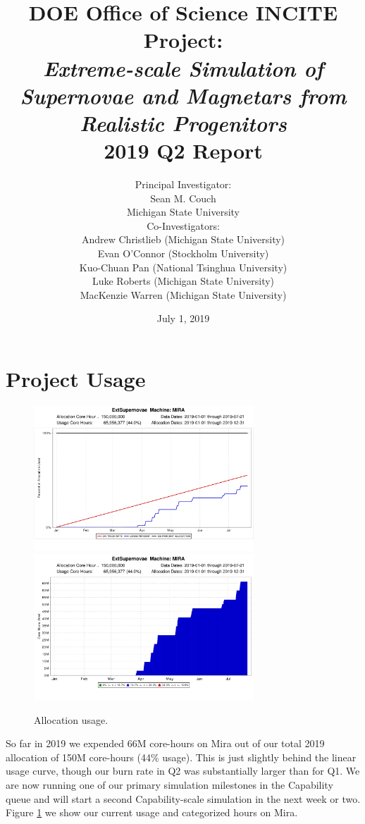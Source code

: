 \documentclass[12pt,titlepage]{article}
\title{DOE Office of Science INCITE Project:\\
{\it Extreme-scale Simulation of Supernovae and Magnetars from Realistic Progenitors}\\
2019 Q2 Report}
\author{Principal Investigator:\\Sean M. Couch\\
  Michigan State University \vspace{0.1in}\\
  Co-Investigators: \\
  Andrew Christlieb (Michigan State University) \\
  Evan O'Connor (Stockholm University)\\
  Kuo-Chuan Pan (National Tsinghua University) \\
  Luke Roberts (Michigan State University) \\
  MacKenzie Warren (Michigan State University) \\
}
\date{July 1, 2019}
\begin{document}
\maketitle


\section{Project Usage}



\begin{figure}
    \includegraphics[width=3.25in]{on_track_graph_mira.png}
    \includegraphics[width=3.25in]{categorized_hours_graph_mira.png} \\
  \caption{Allocation usage.}
  \label{fig:usage}
\end{figure}

So far in 2019 we expended 66M core-hours on Mira out of our total 2019 allocation of 150M core-hours (44\% usage). 
This is just slightly behind the linear usage curve, though our burn rate in Q2 was substantially larger than for Q1.
We are now running one of our primary simulation milestones in the Capability queue and will start a second Capability-scale simulation in the next week or two. 
Figure \ref{fig:usage} we show our current usage and categorized hours on Mira.
\end{document}
